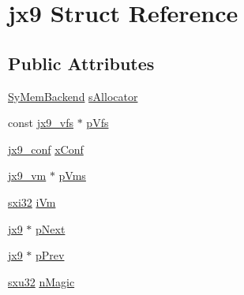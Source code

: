 \hypertarget{structjx9}{\section{jx9 Struct Reference}
\label{d4/da4/structjx9}
}
\subsection*{Public Attributes}
\begin{DoxyCompactItemize}
\item 
\hyperlink{struct_sy_mem_backend}{Sy\-Mem\-Backend} \hyperlink{structjx9_ac3ebe84eca3af6d35bf799c9b5ca8a5c}{s\-Allocator}
\item 
const \hyperlink{structjx9__vfs}{jx9\-\_\-vfs} $\ast$ \hyperlink{structjx9_af8c57e958146bf8a2d29f3ed938630e6}{p\-Vfs}
\item 
\hyperlink{structjx9__conf}{jx9\-\_\-conf} \hyperlink{structjx9_afbb12e02cc36044030154df3d0dee5f3}{x\-Conf}
\item 
\hyperlink{structjx9__vm}{jx9\-\_\-vm} $\ast$ \hyperlink{structjx9_aa1fe6006c1dbe36c5e9995836d7554a0}{p\-Vms}
\item 
\hyperlink{unqlite_8c_a5a58035d4ae379178e2ca46cc3272fc5}{sxi32} \hyperlink{structjx9_adb5f0cb196285304e100d75d284930a4}{i\-Vm}
\item 
\hyperlink{structjx9}{jx9} $\ast$ \hyperlink{structjx9_acb1d5d2fbd43755e85393feb979def92}{p\-Next}
\item 
\hyperlink{structjx9}{jx9} $\ast$ \hyperlink{structjx9_a2793861109a20981e620f3f61e875d25}{p\-Prev}
\item 
\hyperlink{unqlite_8c_abc5a8a3f345c200c98c485551f49666e}{sxu32} \hyperlink{structjx9_a1d138dfc6c945e0bc368c84b6681b024}{n\-Magic}
\end{DoxyCompactItemize}


